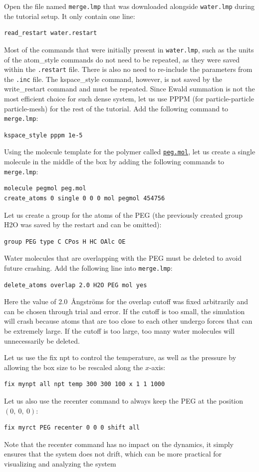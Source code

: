 \documentclass[9pt,tutorial]{livecoms}
\newcommand{\lmpcmd}[1]{\hspace{0pt}\colorbox{listing}{\textcolor{command}{\small{#1}}}\hspace{0pt}} %
\newcommand{\flecmd}[1]{\textcolor{command}{\texttt{#1}}} %
\newcommand{\dwlcmd}[1]{\textcolor{download}{\texttt{#1}}} %
\newcommand{\filepath}{https://raw.githubusercontent.com/lammpstutorials/lammpstutorials-article/main/files/}
\begin{document}
Open the file named \flecmd{merge.lmp} that was downloaded
alongside \flecmd{water.lmp} during the tutorial setup.  It only contain one line:
\begin{lstlisting}
read_restart water.restart
\end{lstlisting}
Most of the commands that were initially present in \flecmd{water.lmp}, such as
the \lmpcmd{units} of the \lmpcmd{atom\_style} commands do not need to be repeated,
as they were saved within the \flecmd{.restart} file.  There is also no need to
re-include the parameters from the \flecmd{.inc} file.  The \lmpcmd{kspace\_style}
command, however, is not saved by the \lmpcmd{write\_restart} command and must be
repeated.  Since Ewald summation is not the most efficient choice for such dense
system, let us use PPPM (for particle-particle particle-mesh) for the rest
of the tutorial.  Add the following command to \flecmd{merge.lmp}:
\begin{lstlisting}
kspace_style pppm 1e-5
\end{lstlisting}

Using the molecule template for the polymer called
\href{\filepath tutorial3/peg.mol}{\dwlcmd{peg.mol}},
let us create a single molecule in the middle of the box by adding the following
commands to \flecmd{merge.lmp}:
\begin{lstlisting}
molecule pegmol peg.mol
create_atoms 0 single 0 0 0 mol pegmol 454756
\end{lstlisting}
Let us create a group for the atoms of the PEG (the previously created
group H2O was saved by the restart and can be omitted):
\begin{lstlisting}
group PEG type C CPos H HC OAlc OE
\end{lstlisting}
Water molecules that are overlapping with the PEG must be deleted to avoid future
crashing.  Add the following line into \flecmd{merge.lmp}:
\begin{lstlisting}
delete_atoms overlap 2.0 H2O PEG mol yes
\end{lstlisting}
Here the value of 2.0~Ångströms for the overlap cutoff was fixed arbitrarily and can
be chosen through trial and error.  If the cutoff is too small, the simulation will
crash because atoms that are too close to each other undergo forces
that can be extremely large.  If the cutoff is too large, too many water
molecules will unnecessarily be deleted.

Let us use the \lmpcmd{fix npt} to control the temperature, as
well as the pressure by allowing the box size to be rescaled along the $x$-axis:
\begin{lstlisting}
fix mynpt all npt temp 300 300 100 x 1 1 1000
\end{lstlisting}
Let us also use the \lmpcmd{recenter} command to always keep the PEG at
the position $(0,~0,~0)$:
\begin{lstlisting}
fix myrct PEG recenter 0 0 0 shift all
\end{lstlisting}
Note that the \lmpcmd{recenter} command has no impact on the dynamics,
it simply ensures that the system does not drift, which can be more practical for visualizing and analyzing the system
\end{document}
